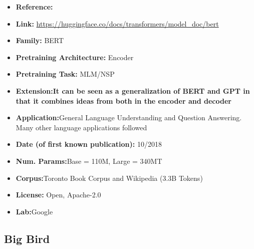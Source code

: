\documentclass{article}
\begin{document}
            \begin{itemize}
                \item \textbf{Reference:} 
                \item \textbf{Link:} \url{https://huggingface.co/docs/transformers/model_doc/bert}
                \item \textbf{Family:} BERT 
                \item \textbf{Pretraining Architecture:} Encoder
                \item \textbf{Pretraining Task:} MLM/NSP
                \item \textbf{Extension:It can be seen as a generalization of BERT and GPT in that it combines ideas from both in the encoder and decoder}   
                \item \textbf{Application:}General Language Understanding and Question Answering. Many other language applications followed
                \item \textbf{Date (of first known publication):} 10/2018
                \item \textbf{Num. Params:}Base = 110M, Large = 340MT
                \item \textbf{Corpus:}Toronto Book Corpus and Wikipedia (3.3B Tokens)
                \item \textbf{License:} Open, Apache-2.0
                \item \textbf{Lab:}Google
            \end{itemize}

\subsection{Big Bird}
\end{document}

